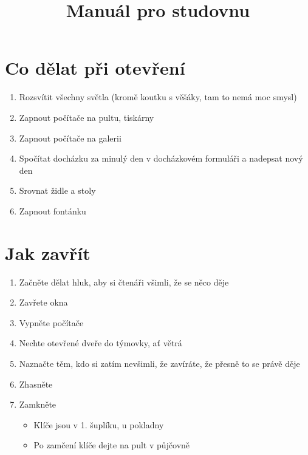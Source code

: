 \documentclass{article}
\begin{document}
\title{Manuál pro studovnu}
\author{}
\maketitle

\renewcommand{\baselinestretch}{0.75}\normalsize
\tableofcontents
\renewcommand{\baselinestretch}{1.0}\normalsize


\section{Co dělat při otevření}

\begin{enumerate}

\item Rozsvítit všechny světla (kromě koutku s věšáky, tam to nemá moc smysl)

\item Zapnout počítače na pultu, tiskárny

\item Zapnout počítače na galerii

\item Spočítat docházku za minulý den v docházkovém formuláři a nadepsat nový den

\item Srovnat židle a stoly

\item Zapnout fontánku
\end{enumerate}


\section{Jak zavřít}
\begin{enumerate}

\item Začněte dělat hluk, aby si čtenáři všimli, že se něco děje

\item Zavřete okna

\item Vypněte počítače
\item Nechte otevřené dveře do týmovky, ať větrá
\item Naznačte těm, kdo si zatím nevšimli, že zavíráte, že přesně to se právě děje
\item Zhasněte
\item Zamkněte
  \begin{itemize}
    \item Klíče jsou v 1. šuplíku, u pokladny
    \item Po zamčení klíče dejte na pult v půjčovně 
  \end{itemize}
\end{enumerate}
\end{document}

